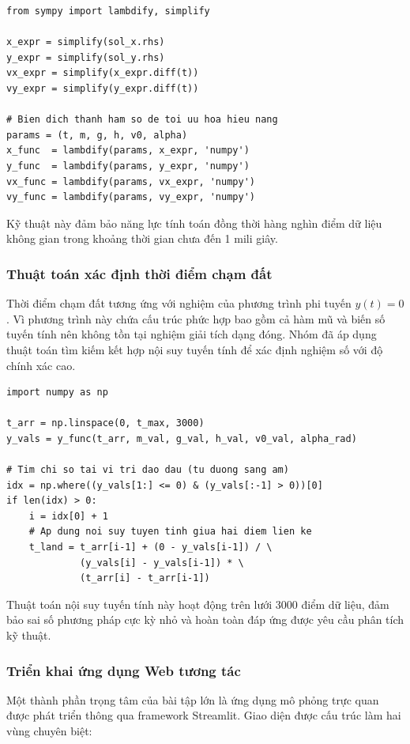 \begin{lstlisting}[style=pythonstyle, caption={Biên dịch biểu thức thành hàm số NumPy}]
from sympy import lambdify, simplify

x_expr = simplify(sol_x.rhs)
y_expr = simplify(sol_y.rhs)
vx_expr = simplify(x_expr.diff(t))
vy_expr = simplify(y_expr.diff(t))

# Bien dich thanh ham so de toi uu hoa hieu nang
params = (t, m, g, h, v0, alpha)
x_func  = lambdify(params, x_expr, 'numpy')
y_func  = lambdify(params, y_expr, 'numpy')
vx_func = lambdify(params, vx_expr, 'numpy')
vy_func = lambdify(params, vy_expr, 'numpy')
\end{lstlisting}

Kỹ thuật này đảm bảo năng lực tính toán đồng thời hàng nghìn điểm dữ liệu không gian trong khoảng thời gian chưa đến 1 mili giây.

\subsubsection{Thuật toán xác định thời điểm chạm đất}
Thời điểm chạm đất tương ứng với nghiệm của phương trình phi tuyến $y(t) = 0$. Vì phương trình này chứa cấu trúc phức hợp bao gồm cả hàm mũ và biến số tuyến tính nên không tồn tại nghiệm giải tích dạng đóng. Nhóm đã áp dụng thuật toán tìm kiếm kết hợp nội suy tuyến tính để xác định nghiệm số với độ chính xác cao.

\begin{lstlisting}[style=pythonstyle, caption={Xác định nghiệm thời điểm chạm đất qua nội suy tuyến tính}]
import numpy as np

t_arr = np.linspace(0, t_max, 3000)
y_vals = y_func(t_arr, m_val, g_val, h_val, v0_val, alpha_rad)

# Tim chi so tai vi tri dao dau (tu duong sang am)
idx = np.where((y_vals[1:] <= 0) & (y_vals[:-1] > 0))[0]
if len(idx) > 0:
    i = idx[0] + 1
    # Ap dung noi suy tuyen tinh giua hai diem lien ke
    t_land = t_arr[i-1] + (0 - y_vals[i-1]) / \
             (y_vals[i] - y_vals[i-1]) * \
             (t_arr[i] - t_arr[i-1])
\end{lstlisting}

Thuật toán nội suy tuyến tính này hoạt động trên lưới 3000 điểm dữ liệu, đảm bảo sai số phương pháp cực kỳ nhỏ và hoàn toàn đáp ứng được yêu cầu phân tích kỹ thuật.

\subsubsection{Triển khai ứng dụng Web tương tác}
Một thành phần trọng tâm của bài tập lớn là ứng dụng mô phỏng trực quan được phát triển thông qua framework Streamlit. Giao diện được cấu trúc làm hai vùng chuyên biệt:

